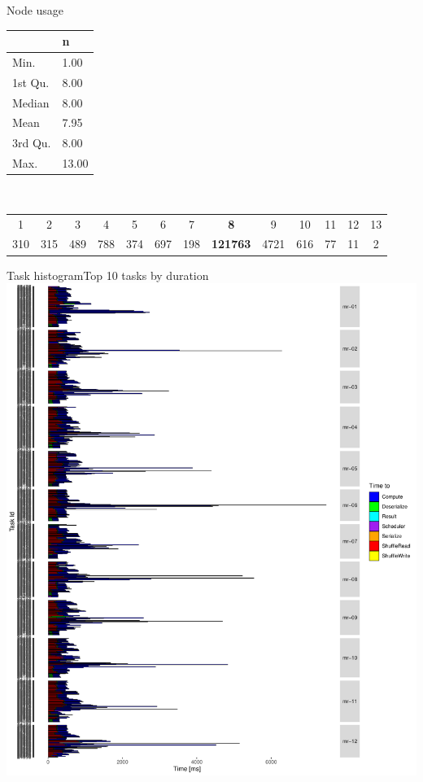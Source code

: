 \documentclass{beamer}
\begin{document}
\begin{frame}{Node usage}
    \centering
    \begin{tabular}{l l}
        \hline
                        & n \\ \hline
        Min.         & 1.00\\  
        1st Qu.    & 8.00 \\ 
        Median    & 8.00\\  
        Mean       & 7.95 \\ 
        3rd Qu.    & 8.00 \\
        Max.        &13.00  \\ \hline
    \end{tabular} \\
    \vspace{0.5cm}
    \begin{tabular}{c c c c c c c c c c c c c}
    1 & 2 & 3 & 4 & 5 & 6 & 7 & \textbf{8} & 9 & 10 & 11 & 12 & 13\\ 
   310 & 315 & 489 & 788 & 374 & 697 & 198 & \textbf{121763} & 4721 & 616 & 77 & 11 & 2 \\ 
    \end{tabular}
\end{frame}

\begin{frame}{Task histogram}{Top 10 tasks by duration}
  \centering
  \href{https://www.cs.ucr.edu/~acald013/public/Research/Figures/TopTaskHist.pdf}{\includegraphics[scale=0.25]{figures/TopTasksHist_pflock17}}
\end{frame}
\end{document}
